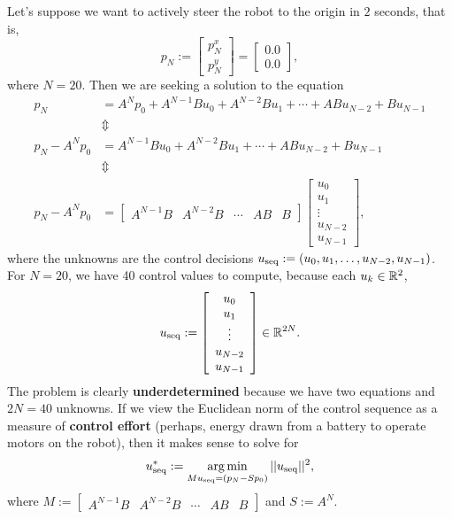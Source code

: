 Let's suppose we want to actively steer the robot to the origin in $2$ seconds, that is, 
$$ p_N:= \begin{bmatrix} p^x_N \\ p^y_N \end{bmatrix} = \begin{bmatrix} 0.0\\ 0.0 \end{bmatrix},$$
where $N=20$. Then we are seeking a solution to the equation
\begin{equation}
\label{eq:FinalConditionUnderDetermined}
\begin{aligned}
    p_N &= A^N p_0 + A^{N-1} B u_0 + A^{N-2} B u_1 + \cdots + A B u_{N-2} + B u_{N-1}\\
    & \Updownarrow\\
     p_N - A^N p_0  & = A^{N-1} B u_0 + A^{N-2} B u_1 + \cdots + A B u_{N-2} + B u_{N-1} \\
      & \Updownarrow\\
       p_N - A^N p_0 &= \left[\begin{array}{ccccc}  A^{N-1} B  & A^{N-2} B  &\cdots & A B  & B  \end{array}  \right] \left[\begin{array}{c}   u_0 \\ u_1 \\ \vdots \\  u_{N-2} \\ u_{N-1} \end{array}  \right],
\end{aligned}
\end{equation} 
where the unknowns are the control decisions $u_{\rm seq}:=(u_0, u_1, \ldots, u_{N-2}, u_{N-1})$. For $N=20$, we have 40 control values to compute, because each $u_k \in \mathbb R^2$,
\begin{equation}
    \label{eq:useqMobileRobot}
    u_{\rm seq}:=\left[\begin{array}{c}   u_0 \\ u_1 \\ \vdots \\  u_{N-2} \\ u_{N-1} \end{array}  \right] \in \mathbb R^{2N}.
\end{equation}
The problem is clearly \textbf{underdetermined} because we have two equations and $2N=40$ unknowns. If we view 
the Euclidean norm of the control sequence as a measure of \textbf{control effort} (perhaps, energy drawn from a battery to operate motors on the robot), then it makes sense to solve for
\begin{equation}
    \label{eq:MobileRobotOptimization}
    u_{\rm seq}^\ast:= \operatorname*{arg\,min}_{ M u_{\rm seq} =  \left(p_{N} - S p_0 \right)} ||u_{\rm seq}||^2,
\end{equation}
where $M:=\left[\begin{array}{ccccc}  A^{N-1} B  & A^{N-2} B  &\cdots & A B  & B  \end{array}  \right]$ and $S:=A^N$. \\

